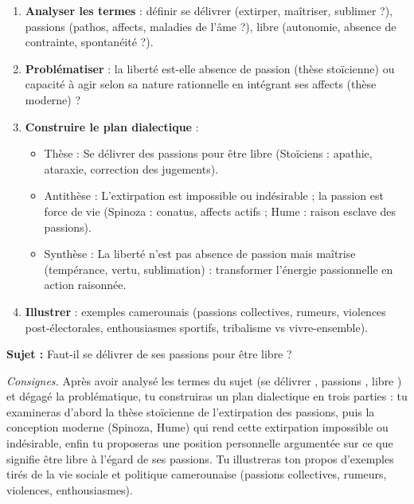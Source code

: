 \documentclass[11pt]{article}
\newcommand{\cle}[1]{{\popxbold\color{popdark}#1}}
\begin{document}
\begin{methode}
\begin{enumerate}
\item \textbf{Analyser les termes} : définir \guillemotleft se délivrer \guillemotright (extirper, maîtriser, sublimer ?), \guillemotleft passions \guillemotright (pathos, affects, maladies de l'âme ?), \guillemotleft libre \guillemotright (autonomie, absence de contrainte, spontanéité ?).
\item \textbf{Problématiser} : la liberté est-elle absence de passion (thèse stoïcienne) ou capacité à agir selon sa nature rationnelle en intégrant ses affects (thèse moderne) ?
\item \textbf{Construire le plan dialectique} :
\begin{itemize}
\item Thèse : Se délivrer des passions pour être libre (Stoïciens : apathie, ataraxie, correction des jugements).
\item Antithèse : L'extirpation est impossible ou indésirable ; la passion est force de vie (Spinoza : conatus, affects actifs ; Hume : raison esclave des passions).
\item Synthèse : La liberté n'est pas absence de passion mais \cle{maîtrise} (tempérance, vertu, sublimation) : transformer l'énergie passionnelle en action raisonnée.
\end{itemize}
\item \textbf{Illustrer} : exemples camerounais (passions collectives, rumeurs, violences post-électorales, enthousiasmes sportifs, tribalisme vs vivre-ensemble).
\end{enumerate}
\end{methode}

\begin{exercice}
\textbf{Sujet :} Faut-il se délivrer de ses passions pour être libre ?

\textit{Consignes.} Après avoir analysé les termes du sujet (\guillemotleft se délivrer \guillemotright, \guillemotleft passions \guillemotright, \guillemotleft libre \guillemotright) et dégagé la problématique, tu construiras un plan dialectique en trois parties : tu examineras d'abord la thèse stoïcienne de l'extirpation des passions, puis la conception moderne (Spinoza, Hume) qui rend cette extirpation impossible ou indésirable, enfin tu proposeras une position personnelle argumentée sur ce que signifie être libre à l'égard de ses passions. Tu illustreras ton propos d'exemples tirés de la vie sociale et politique camerounaise (passions collectives, rumeurs, violences, enthousiasmes).
\end{exercice}
\end{document}
